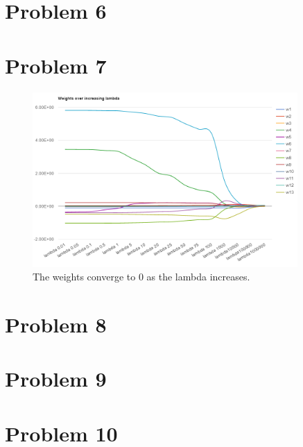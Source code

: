 \documentclass[journal]{IEEEtran}
\begin{document}
\medskip

\section{Problem 6}
\medskip

\section{Problem 7}
\begin{figure}[!h]
\centering
\captionsetup{justification=centering,margin=2cm}
\includegraphics[width=0.9\textwidth]{weights_lambda.PNG}
\caption{\label{fig:lambdas}The weights converge to 0 as the lambda increases.}
\end{figure}
\medskip

\section{Problem 8}
\medskip

\section{Problem 9}
\medskip

\section{Problem 10}
\medskip

 
\end{document}

